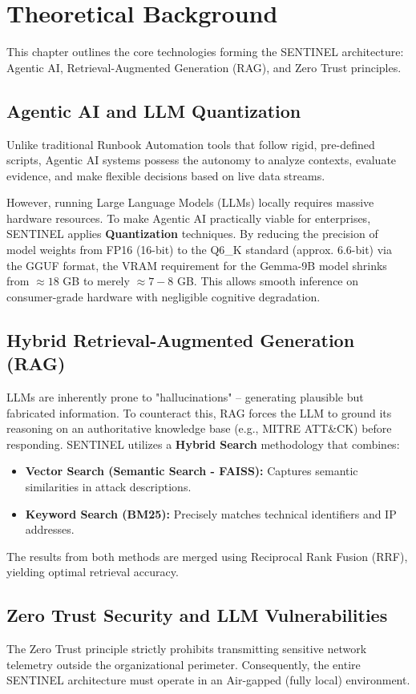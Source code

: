 \chapter{Theoretical Background}
\label{ch:theoretical_background}

This chapter outlines the core technologies forming the SENTINEL architecture: Agentic AI, Retrieval-Augmented Generation (RAG), and Zero Trust principles.

\section{Agentic AI and LLM Quantization}
Unlike traditional Runbook Automation tools that follow rigid, pre-defined scripts, Agentic AI systems possess the autonomy to analyze contexts, evaluate evidence, and make flexible decisions based on live data streams.

However, running Large Language Models (LLMs) locally requires massive hardware resources. To make Agentic AI practically viable for enterprises, SENTINEL applies \textbf{Quantization} techniques. By reducing the precision of model weights from FP16 (16-bit) to the Q6\_K standard (approx. 6.6-bit) via the GGUF format, the VRAM requirement for the Gemma-9B model shrinks from $\approx 18$ GB to merely $\approx 7-8$ GB. This allows smooth inference on consumer-grade hardware with negligible cognitive degradation.

\section{Hybrid Retrieval-Augmented Generation (RAG)}
LLMs are inherently prone to "hallucinations" -- generating plausible but fabricated information. To counteract this, RAG forces the LLM to ground its reasoning on an authoritative knowledge base (e.g., MITRE ATT\&CK) before responding.
SENTINEL utilizes a \textbf{Hybrid Search} methodology that combines:
\begin{itemize}
    \item \textbf{Vector Search (Semantic Search - FAISS):} Captures semantic similarities in attack descriptions.
    \item \textbf{Keyword Search (BM25):} Precisely matches technical identifiers and IP addresses.
\end{itemize}
The results from both methods are merged using Reciprocal Rank Fusion (RRF), yielding optimal retrieval accuracy.

\section{Zero Trust Security and LLM Vulnerabilities}
The Zero Trust principle strictly prohibits transmitting sensitive network telemetry outside the organizational perimeter. Consequently, the entire SENTINEL architecture must operate in an Air-gapped (fully local) environment.

